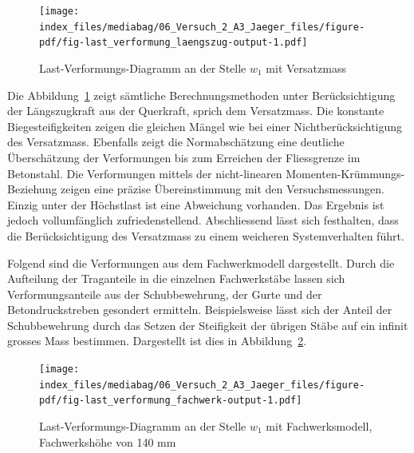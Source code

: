 \documentclass[
  12pt,
  letterpaper,
  egregdoesnotlikesansseriftitles]{scrreprt}
\begin{document}
\begin{figure}[H]

{\centering \texttt{[image: index\_files/mediabag/06\_Versuch\_2\_A3\_Jaeger\_files/figure-pdf/fig-last\_verformung\_laengszug-output-1.pdf]}

}

\caption{\label{fig-last_verformung_laengszug}Last-Verformungs-Diagramm
an der Stelle \(w_1\) mit Versatzmass}

\end{figure}

Die Abbildung~\ref{fig-last_verformung_laengszug} zeigt sämtliche
Berechnungsmethoden unter Berücksichtigung der Längszugkraft aus der
Querkraft, sprich dem Versatzmass. Die konstante Biegesteifigkeiten
zeigen die gleichen Mängel wie bei einer Nichtberücksichtigung des
Versatzmass. Ebenfalls zeigt die Normabschätzung eine deutliche
Überschätzung der Verformungen bis zum Erreichen der Fliessgrenze im
Betonstahl. Die Verformungen mittels der nicht-linearen
Momenten-Krümmungs-Beziehung zeigen eine präzise Übereinstimmung mit den
Versuchsmessungen. Einzig unter der Höchstlast ist eine Abweichung
vorhanden. Das Ergebnis ist jedoch vollumfänglich zufriedenstellend.
Abschliessend lässt sich festhalten, dass die Berücksichtigung des
Versatzmass zu einem weicheren Systemverhalten führt.

Folgend sind die Verformungen aus dem Fachwerkmodell dargestellt. Durch
die Aufteilung der Traganteile in die einzelnen Fachwerkstäbe lassen
sich Verformungsanteile aus der Schubbewehrung, der Gurte und der
Betondruckstreben gesondert ermitteln. Beispielsweise lässt sich der
Anteil der Schubbewehrung durch das Setzen der Steifigkeit der übrigen
Stäbe auf ein infinit grosses Mass bestimmen. Dargestellt ist dies in
Abbildung~\ref{fig-last_verformung_fachwerk}.

\begin{figure}[H]

{\centering \texttt{[image: index\_files/mediabag/06\_Versuch\_2\_A3\_Jaeger\_files/figure-pdf/fig-last\_verformung\_fachwerk-output-1.pdf]}

}

\caption{\label{fig-last_verformung_fachwerk}Last-Verformungs-Diagramm
an der Stelle \(w_1\) mit Fachwerksmodell, Fachwerkshöhe von 140 mm}

\end{figure}
\end{document}
